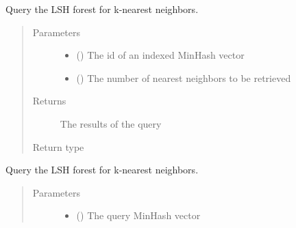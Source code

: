 \documentclass[letterpaper,10pt,english]{sphinxmanual}
\begin{document}
\begin{fulllineitems}
\begin{fulllineitems}
\begin{quote}
\begin{description}
\end{description}\end{quote}

\end{fulllineitems}


\begin{fulllineitems}
\label{\detokenize{documentation:tmap.LSHForest.query_by_id}}
Query the LSH forest for k-nearest neighbors.
\begin{quote}\begin{description}
\item[{Parameters}] \leavevmode\begin{itemize}
\item {} 
 () \textendash{} The id of an indexed MinHash vector

\item {} 
 () \textendash{} The number of nearest neighbors to be retrieved

\end{itemize}

\item[{Returns}] \leavevmode
The results of the query

\item[{Return type}] \leavevmode
{}

\end{description}\end{quote}

\end{fulllineitems}


\begin{fulllineitems}
\label{\detokenize{documentation:tmap.LSHForest.query_exclude}}
Query the LSH forest for k-nearest neighbors.
\begin{quote}\begin{description}
\item[{Parameters}] \leavevmode\begin{itemize}
\item {} 
 () \textendash{} The query MinHash vector


\end{itemize}
\end{description}
\end{quote}
\end{fulllineitems}
\end{fulllineitems}
\end{document}
